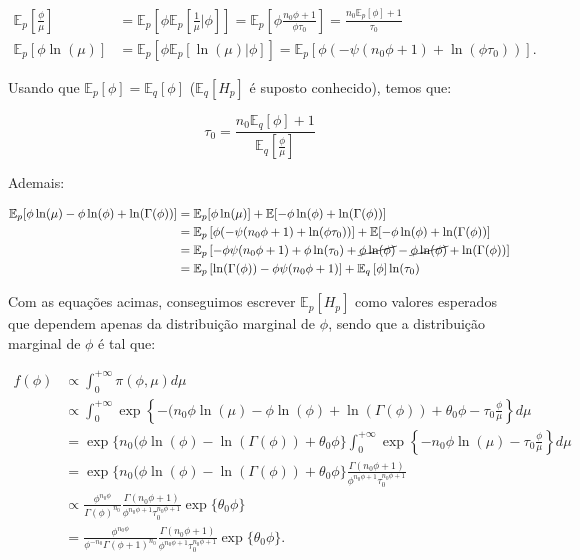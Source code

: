 \documentclass[
]{article}
\begin{document}
\[
\begin{aligned}
\mathbb{E}_{p}\left[\frac{\phi}{\mu}\right]&=\mathbb{E}_{p}[\phi\mathbb{E}_{p}\left[\frac{1}{\mu}|\phi\right]]=\mathbb{E}_{p}\left[\phi\frac{n_0\phi+1}{\phi \tau_0}\right]=\frac{n_0\mathbb{E}_{p}\left[\phi\right]+1}{ \tau_0}\\
\mathbb{E}_{p}[\phi\ln(\mu)]&=\mathbb{E}_{p}[\phi\mathbb{E}_{p}[\ln(\mu)|\phi]]=\mathbb{E}_{p}\left[\phi(-\psi(n_0 \phi +1 )+\ln(\phi\tau_0))\right].
 \end{aligned}
\]

Usando que
\(\mathbb{E}_{p}\left[\phi\right]=\mathbb{E}_q\left[\phi\right]\)
(\(\mathbb{E}_q\left[H_p\right]\) é suposto conhecido), temos que:

\[
\tau_0=\frac{n_0\mathbb{E}_{q}\left[\phi\right]+1}{\mathbb{E}_{q}\left[\frac{\phi}{\mu}\right]}
\]

Ademais:

\[
\begin{aligned}
\mathbb{E}_{p}[\phi\ln(\mu)-\phi\ln(\phi)+\ln(\Gamma(\phi))]&=\mathbb{E}_{p}[\phi\ln(\mu)]+\mathbb{E}[-\phi\ln(\phi)+\ln(\Gamma(\phi))]\\
&=\mathbb{E}_{p}\left[\phi(-\psi(n_0 \phi +1 )+\ln(\phi\tau_0))\right]+\mathbb{E}[-\phi\ln(\phi)+\ln(\Gamma(\phi))]\\
&=\mathbb{E}_{p}\left[-\phi\psi(n_0 \phi +1 )+\phi\ln(\tau_0)+\cancel{\phi\ln(\phi)}-\cancel{\phi\ln(\phi)}+\ln(\Gamma(\phi))\right]\\
&=\mathbb{E}_{p}\left[\ln(\Gamma(\phi))-\phi\psi(n_0 \phi +1 )\right]+\mathbb{E}_q\left[\phi\right]\ln(\tau_0)
 \end{aligned}
\]

Com as equações acimas, conseguimos escrever \(\mathbb{E}_{p}[H_{p}]\)
como valores esperados que dependem apenas da distribuição marginal de
\(\phi\), sendo que a distribuição marginal de \(\phi\) é tal que:

\[
\begin{aligned}
f(\phi)&\propto \int_0^{+\infty}\pi(\phi,\mu) d\mu\\
&\propto \int_0^{+\infty}\exp\left\{-(n_0\phi \ln(\mu)-\phi\ln(\phi)+\ln(\Gamma(\phi))+\theta_0\phi-\tau_0\frac{\phi}{\mu}\right\}d\mu\\
&= \exp\{n_0(\phi\ln(\phi)-\ln(\Gamma(\phi))+\theta_0\phi\}\int_0^{+\infty}\exp\left\{-n_0\phi \ln(\mu)-\tau_0\frac{\phi}{\mu}\right\}d\mu\\
&= \exp\{n_0(\phi\ln(\phi)-\ln(\Gamma(\phi))+\theta_0\phi\}\frac{\Gamma(n_0\phi+1)}{\phi^{n_0\phi+1}\tau_0^{n_0\phi+1}}\\
&\propto \frac{\phi^{n_0\phi}}{\Gamma(\phi)^{n_0}}\frac{\Gamma(n_0\phi+1)}{\phi^{n_0\phi+1}\tau_0^{n_0\phi+1}}\exp\{\theta_0\phi\}\\
&= \frac{\phi^{n_0\phi}}{\phi^{-n_0}\Gamma(\phi+1)^{n_0}}\frac{\Gamma(n_0\phi+1)}{\phi^{n_0\phi+1}\tau_0^{n_0\phi+1}}\exp\{\theta_0\phi\}.
 \end{aligned}
\]
\end{document}
